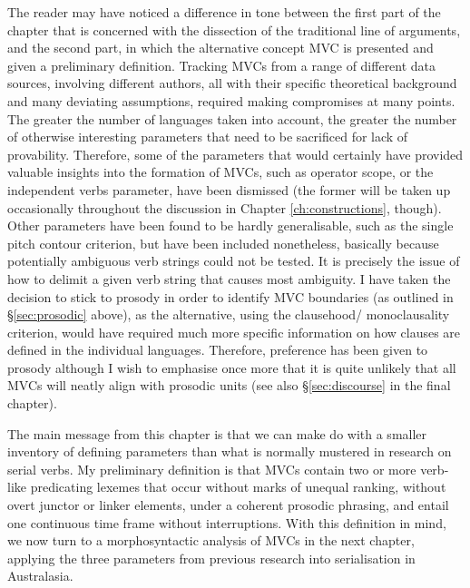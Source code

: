 The reader may have noticed a difference in tone between the first part of the chapter that is concerned with the dissection of the traditional line of arguments, and the second part, in which the alternative concept MVC is presented and given a preliminary definition. Tracking MVCs from a range of different data sources, involving different authors, all with their specific theoretical background and many deviating assumptions, required making compromises at many points. The greater the number of languages taken into account, the greater the number of otherwise interesting parameters that need to be sacrificed for lack of provability. Therefore, some of the parameters that would certainly have provided valuable insights into the formation of MVCs, such as operator scope, or the independent verbs parameter, have been dismissed (the former will be taken up occasionally throughout the discussion in Chapter \ref{ch:constructions}, though). Other parameters have been found to be hardly generalisable, such as the single pitch contour criterion, but have been included nonetheless, basically because potentially ambiguous verb strings could not be tested. It is precisely the issue of how to delimit a given verb string that causes most ambiguity. I have taken the decision to stick to prosody in order to identify MVC boundaries (as outlined in §\ref{sec:prosodic} above), as the alternative, using the clausehood/ monoclausality criterion, would have required much more specific information on how clauses are defined in the individual languages. Therefore, preference has been given to prosody although I wish to emphasise once more that it is quite unlikely that all MVCs will neatly align with prosodic units (see also §\ref{sec:discourse} in the final chapter).

The main message from this chapter is that we can make do with a smaller inventory of defining parameters than what is normally mustered in research on serial verbs. My preliminary definition is that MVCs contain two or more verb-like predicating lexemes that occur without marks of unequal ranking, without overt junctor or linker elements, under a coherent prosodic phrasing, and entail one continuous time frame without interruptions. With this definition in mind, we now turn to a morphosyntactic analysis of MVCs in the next chapter, applying the three parameters from previous research into serialisation in Australasia. 
